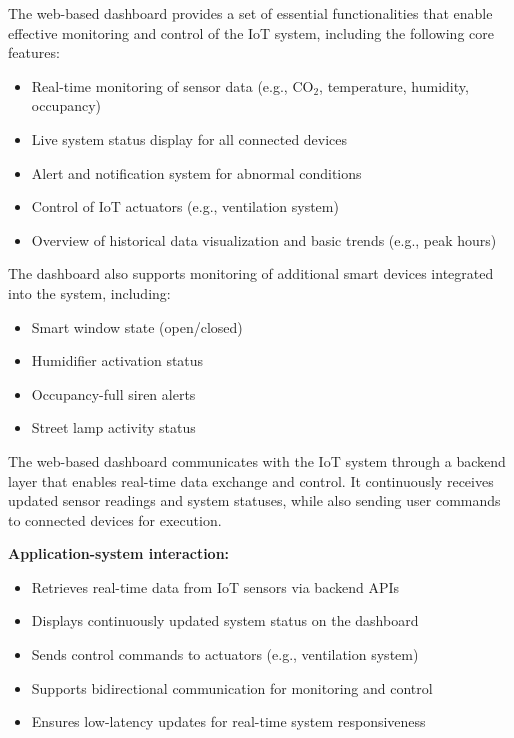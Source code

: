 The web-based dashboard provides a set of essential functionalities that enable effective monitoring and control of the IoT system, including the following core features:

\begin{itemize}
  \item Real-time monitoring of sensor data (e.g., CO$_2$, temperature, humidity, occupancy)
  \item Live system status display for all connected devices
  \item Alert and notification system for abnormal conditions
  \item Control of IoT actuators (e.g., ventilation system)
  \item Overview of historical data visualization and basic trends (e.g., peak hours)
\end{itemize}

The dashboard also supports monitoring of additional smart devices integrated into the system, including:
\begin{itemize}
  \item Smart window state (open/closed)
  \item Humidifier activation status
  \item Occupancy-full siren alerts
  \item Street lamp activity status
\end{itemize}

The web-based dashboard communicates with the IoT system through a backend layer that enables real-time data exchange and control. It continuously receives updated sensor readings and system statuses, while also sending user commands to connected devices for execution.

\textbf{Application-system interaction:}

\begin{itemize}
  \item Retrieves real-time data from IoT sensors via backend APIs
  \item Displays continuously updated system status on the dashboard
  \item Sends control commands to actuators (e.g., ventilation system)
  \item Supports bidirectional communication for monitoring and control
  \item Ensures low-latency updates for real-time system responsiveness
\end{itemize}


